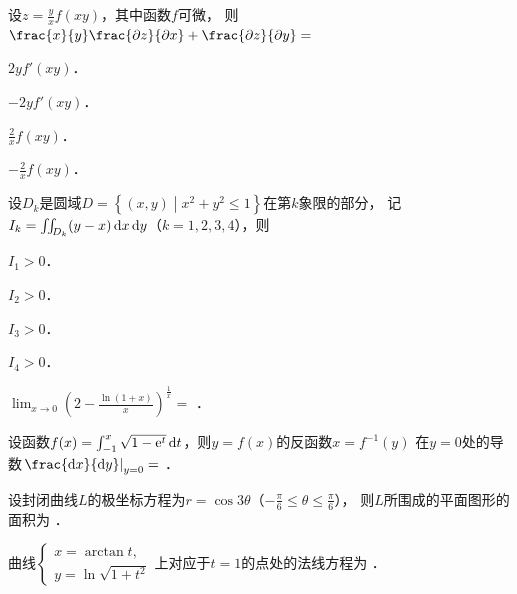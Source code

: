 \documentclass[plain,noanswer,medmath]{../../template/jnuexam}
\begin{document}
\begin{problem}
设$z = \frac{y}{x}f(xy)$，其中函数$f$可微，
则$\frac{x}{y}\frac{\pdz}{\pdx} + \frac{\pdz}{\pdy} =$\pickout{}
\begin{abcd}
\item $2yf'(xy)$．
\item $- 2yf'(xy)$．
\item $\frac{2}{x}f(xy)$．
\item $- \frac{2}{x}f(xy)$．
\end{abcd}
\end{problem}


\begin{problem}
设$D_k$是圆域$D = \left\{(x,y)\middle|x^2 + y^2 \le 1 \right\}$在第$k$象限的部分，
记\goodbreak$I_k = \iint_{D_k} (y - x)\mathop{}\!\mathrm{d} x\mathop{}\!\mathrm{d} y$（$k = 1,2,3,4$），则\pickout{}
\begin{abcd}
\item $I_1 > 0$．
\item $I_2 > 0$．
\item $I_3 > 0$．
\item $I_4 > 0$．
\end{abcd}
\end{problem}








\begin{problem}
$\lim_{x \to 0} \left(2 - \frac{\ln(1 + x)}{x} \right)^{\frac{1}{x}} =$ \fillin{}．
\end{problem}


\begin{problem}
设函数$f(x) = \int_{-1}^x \sqrt{1 - \mathrm{e}^t} \mathop{}\!\mathrm{d} t$，则$y = f(x)$的反函数$x = f^{-1}(y)$
在$y = 0$处的导数$\left. \frac{\dx}{\dy} \right|_{y = 0} =$ \fillin{}．
\end{problem}


\begin{problem}
设封闭曲线$L$的极坐标方程为$r = \cos 3\theta$（$- \frac{\pi}{6} \le \theta \le \frac{\pi}{6}$），
则$L$所围成的平面图形的面积为 \fillin{}．
\end{problem}


\begin{problem}
曲线$\begin{cases}
  x = \arctan t, \\
  y = \ln \sqrt{1 + t^2}
\end{cases}$上对应于$t = 1$的点处的法线方程为 \fillin{}．
\end{problem}
\end{document}
